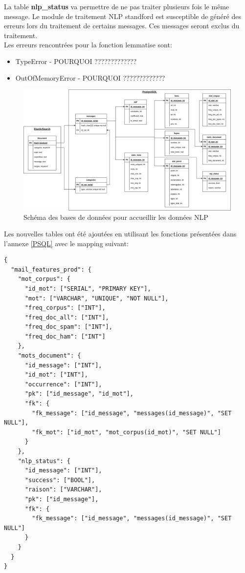 \documentclass[a4paper,12pt]{article}
\begin{document}
		 	La table \textbf{nlp\_status} va permettre de ne pas traiter plusieurs fois le même message. Le module de traitement NLP standford est susceptible de généré des erreurs lors du traitement de certains messages. Ces messages seront exclus du traitement. \\
		 	
		 	Les erreurs rencontrées pour la fonction lemmatise sont:
		 	\begin{itemize}
		 		\item TypeError - POURQUOI ?????????????
		 		\item OutOfMemoryError - POURQUOI ?????????????
		 	\end{itemize}
		 	
			\begin{figure}[H]
				\includegraphics[width=\linewidth]{img/p2Bdd.png}
				\caption{Schéma des bases de données pour accueillir les données NLP}
			\end{figure}
			
			
			Les nouvelles tables ont été ajoutées en utilisant les fonctions présentées dans l'annexe \ref{PSQL} avec le mapping suivant:
			\begin{lstlisting}[title=Mapping nouvelles tables]
{
  "mail_features_prod": {
    "mot_corpus": {
      "id_mot": ["SERIAL", "PRIMARY KEY"],
      "mot": ["VARCHAR", "UNIQUE", "NOT NULL"],
      "freq_corpus": ["INT"],
      "freq_doc_all": ["INT"],
      "freq_doc_spam": ["INT"],
      "freq_doc_ham": ["INT"]
    },
    "mots_document": {
      "id_message": ["INT"],
      "id_mot": ["INT"],
      "occurrence": ["INT"],
      "pk": ["id_message", "id_mot"],
      "fk": {
        "fk_message": ["id_message", "messages(id_message)", "SET NULL"],
        "fk_mot": ["id_mot", "mot_corpus(id_mot)", "SET NULL"]
      }
    },
    "nlp_status": {
      "id_message": ["INT"],
      "success": ["BOOL"],
      "raison": ["VARCHAR"],
      "pk": ["id_message"],
      "fk": {
        "fk_message": ["id_message", "messages(id_message)", "SET NULL"]
      }
    }
  }
}
			\end{lstlisting}
			
\end{document}
